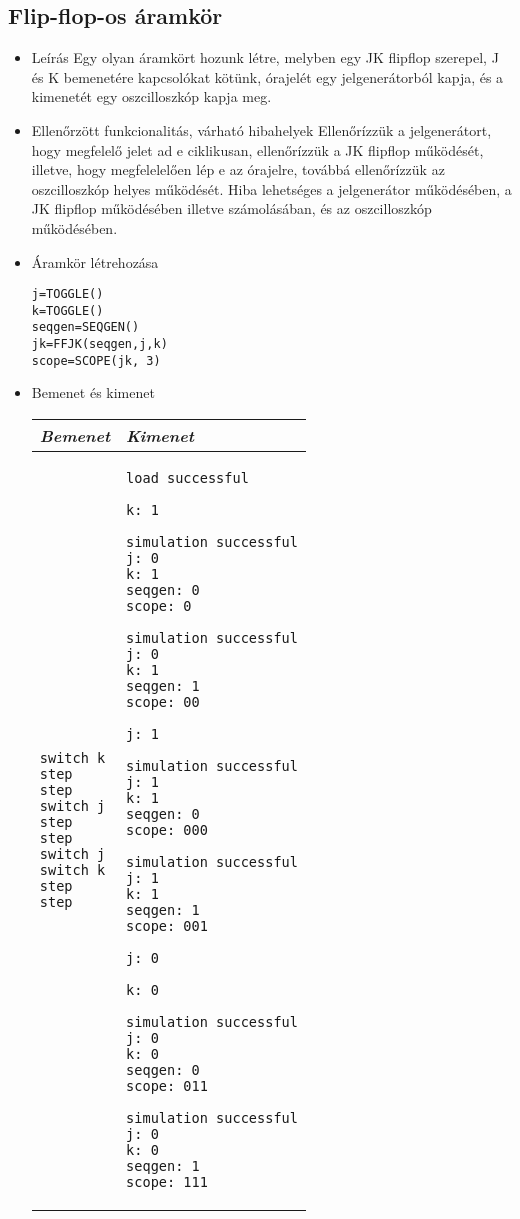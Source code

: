 \subsection{Flip-flop-os áramkör}
\begin{itemize}
\item Leírás\newline
Egy olyan áramkört hozunk létre, melyben egy JK flipflop szerepel, J és K bemenetére kapcsolókat kötünk, órajelét egy jelgenerátorból kapja, és a kimenetét egy oszcilloszkóp kapja meg.
\item Ellenőrzött funkcionalitás, várható hibahelyek\newline
Ellenőrízzük a jelgenerátort, hogy megfelelő jelet ad e ciklikusan, ellenőrízzük a JK flipflop működését, illetve, hogy megfelelelően lép e az órajelre, továbbá ellenőrízzük az oszcilloszkóp helyes működését. Hiba lehetséges a jelgenerátor működésében, a JK flipflop működésében illetve számolásában, és az oszcilloszkóp működésében.

\item Áramkör létrehozása

\begin{verbatim}
j=TOGGLE()
k=TOGGLE()
seqgen=SEQGEN()
jk=FFJK(seqgen,j,k)
scope=SCOPE(jk, 3)
\end{verbatim}

\item Bemenet és kimenet\newline

\begin{tabular}{|p{7cm}|p{7cm}|} 
\hline 
\textit{Bemenet} & \textit{Kimenet} \\ \hline
\begin{verbatim}
switch k
step
step
switch j
step
step
switch j
switch k
step
step
\end{verbatim}
& 
\begin{verbatim}
load successful

k: 1

simulation successful
j: 0
k: 1
seqgen: 0
scope: 0

simulation successful
j: 0
k: 1
seqgen: 1
scope: 00

j: 1

simulation successful
j: 1
k: 1
seqgen: 0
scope: 000

simulation successful
j: 1
k: 1
seqgen: 1
scope: 001

j: 0

k: 0

simulation successful
j: 0
k: 0
seqgen: 0
scope: 011

simulation successful
j: 0
k: 0
seqgen: 1
scope: 111
\end{verbatim}
\\ \hline
\end{tabular}

\end{itemize}


